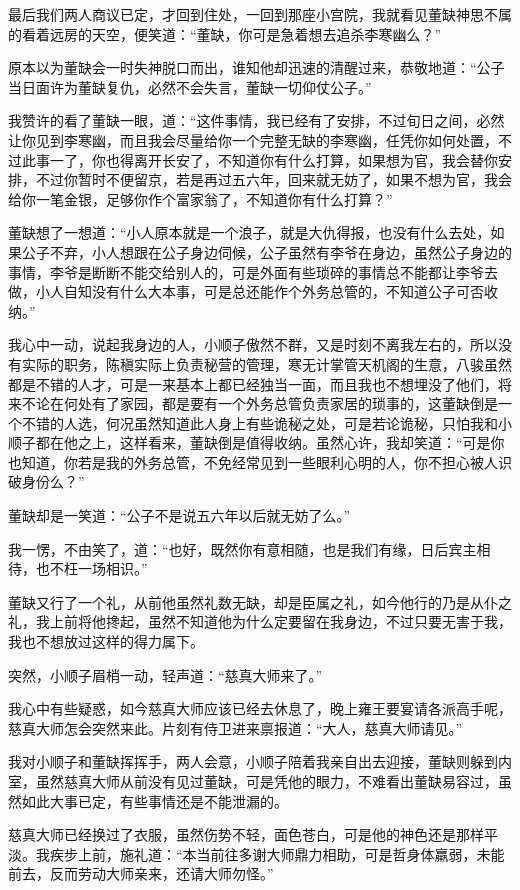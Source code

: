 最后我们两人商议已定，才回到住处，一回到那座小宫院，我就看见董缺神思不属的看着远房的天空，便笑道：“董缺，你可是急着想去追杀李寒幽么？”

原本以为董缺会一时失神脱口而出，谁知他却迅速的清醒过来，恭敬地道：“公子当日面许为董缺复仇，必然不会失言，董缺一切仰仗公子。”

我赞许的看了董缺一眼，道：“这件事情，我已经有了安排，不过旬日之间，必然让你见到李寒幽，而且我会尽量给你一个完整无缺的李寒幽，任凭你如何处置，不过此事一了，你也得离开长安了，不知道你有什么打算，如果想为官，我会替你安排，不过你暂时不便留京，若是再过五六年，回来就无妨了，如果不想为官，我会给你一笔金银，足够你作个富家翁了，不知道你有什么打算？”

董缺想了一想道：“小人原本就是一个浪子，就是大仇得报，也没有什么去处，如果公子不弃，小人想跟在公子身边伺候，公子虽然有李爷在身边，虽然公子身边的事情，李爷是断断不能交给别人的，可是外面有些琐碎的事情总不能都让李爷去做，小人自知没有什么大本事，可是总还能作个外务总管的，不知道公子可否收纳。”

我心中一动，说起我身边的人，小顺子傲然不群，又是时刻不离我左右的，所以没有实际的职务，陈稹实际上负责秘营的管理，寒无计掌管天机阁的生意，八骏虽然都是不错的人才，可是一来基本上都已经独当一面，而且我也不想埋没了他们，将来不论在何处有了家园，都是要有一个外务总管负责家居的琐事的，这董缺倒是一个不错的人选，何况虽然知道此人身上有些诡秘之处，可是若论诡秘，只怕我和小顺子都在他之上，这样看来，董缺倒是值得收纳。虽然心许，我却笑道：“可是你也知道，你若是我的外务总管，不免经常见到一些眼利心明的人，你不担心被人识破身份么？”

董缺却是一笑道：“公子不是说五六年以后就无妨了么。”

我一愣，不由笑了，道：“也好，既然你有意相随，也是我们有缘，日后宾主相待，也不枉一场相识。”

董缺又行了一个礼，从前他虽然礼数无缺，却是臣属之礼，如今他行的乃是从仆之礼，我上前将他搀起，虽然不知道他为什么定要留在我身边，不过只要无害于我，我也不想放过这样的得力属下。

突然，小顺子眉梢一动，轻声道：“慈真大师来了。”

我心中有些疑惑，如今慈真大师应该已经去休息了，晚上雍王要宴请各派高手呢，慈真大师怎会突然来此。片刻有侍卫进来禀报道：“大人，慈真大师请见。”

我对小顺子和董缺挥挥手，两人会意，小顺子陪着我亲自出去迎接，董缺则躲到内室，虽然慈真大师从前没有见过董缺，可是凭他的眼力，不难看出董缺易容过，虽然如此大事已定，有些事情还是不能泄漏的。

慈真大师已经换过了衣服，虽然伤势不轻，面色苍白，可是他的神色还是那样平淡。我疾步上前，施礼道：“本当前往多谢大师鼎力相助，可是哲身体羸弱，未能前去，反而劳动大师亲来，还请大师勿怪。”

